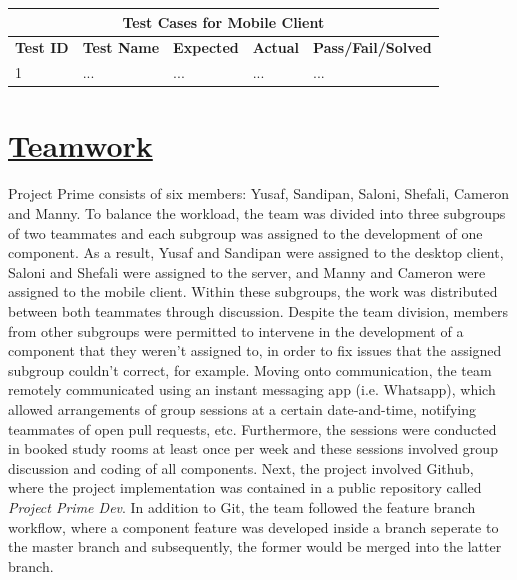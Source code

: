 \documentclass{article}
\begin{document}
\begin{tabular}{|p{2cm}|p{2cm}|p{3cm}|p{3cm}|p{3cm}|}
\hline
\multicolumn{5}{|c|}{\textbf{Test Cases for Mobile Client}} \\
\hline
\textbf{Test ID} & \textbf{Test Name} & \textbf{Expected} & \textbf{Actual} & \textbf{Pass/Fail/Solved} \\
\hline
1 & ... & ... & ... & ... \\
\hline
\end{tabular}

\section{\underline{Teamwork}}
Project Prime consists of six members: Yusaf, Sandipan, Saloni, Shefali, Cameron and Manny. To balance the workload, the team was divided into three subgroups of two teammates and each subgroup was assigned to the development of one component. As a result, Yusaf and Sandipan were assigned to the desktop client, Saloni and Shefali were assigned to the server, and Manny and Cameron were assigned to the mobile client. Within these subgroups, the work was distributed between both teammates through discussion. Despite the team division, members from other subgroups were permitted to intervene in the development of a component that they weren't assigned to, in order to fix issues that the assigned subgroup couldn't correct, for example. Moving onto communication, the team remotely communicated using an instant messaging app (i.e. Whatsapp), which allowed arrangements of group sessions at a certain date-and-time, notifying teammates of open pull requests, etc. Furthermore, the sessions were conducted in booked study rooms at least once per week and these sessions involved group discussion and coding of all components. Next, the project involved Github, where the project implementation was contained in a public repository called \textit{Project Prime Dev}. In addition to Git, the team followed the feature branch workflow, where a component feature was developed inside a branch seperate to the master branch and subsequently, the former would be merged into the latter branch.
\end{document}

